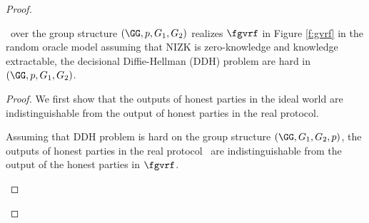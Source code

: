 \begin{proof}
\begin{itemize}
	\end{itemize}
	
	\begin{theorem}\label{thm:rvrf}
		\name \ over the group structure $ (\GG,p,G_1,G_2) $ realizes $ \fgvrf $ in Figure \ref{f:gvrf} in the random oracle model assuming that NIZK is zero-knowledge and knowledge extractable, the decisional Diffie-Hellman (DDH) problem are hard in $ (\GG,p,G_1,G_2)  $. 
	\end{theorem}
	
	\begin{proof}
		
		We first show that the outputs of honest parties in the ideal world are indistinguishable from the output of honest parties in the real protocol. 
		
		\begin{lemma}\label{lem:honestoutput}
			Assuming that DDH problem is hard on the group structure $ (\GG, G_1,G_2,p) $, the outputs of honest parties in the real protocol \name\ are indistinguishable from the output of the honest parties in $ \fgvrf $.
		\end{lemma}
		

\end{proof}
\end{proof}
